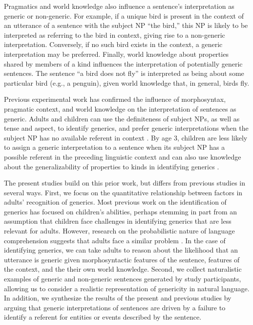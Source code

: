 \documentclass[10pt,letterpaper]{article}
\begin{document}
Pragmatics and world knowledge also influence a sentence's interpretation as generic or non-generic. For example, if a unique bird is present in the context of an utterance of a sentence with the subject NP ``the bird,'' this NP is likely to be interpreted as referring to the bird in context, giving rise to a non-generic interpretation. Conversely, if no such bird exists in the context, a generic interpretation may be preferred. Finally, world knowledge about properties shared by members of a kind influences the interpretation of potentially generic sentences. The sentence ``a bird does not fly'' is interpreted as being about some particular bird (e.g., a penguin), given world knowledge that, in general, birds fly. 

Previous experimental work has confirmed the influence of morphosyntax, pragmatic context, and world knowledge on the interpretation of sentences as generic. Adults and children can use the definiteness of subject NPs, as well as tense and aspect, to identify generics, and prefer generic interpretations when the subject NP has no available referent in context \cite{Gelman:2003,Cimpian:2011}. By age 3, children are less likely to assign a generic interpretation to a sentence when its subject NP has a possible referent in the preceding linguistic context and can also use knowledge about the generalizability of properties to kinds in identifying generics \cite{Cimpian:2008}.

The present studies build on this prior work, but differs from previous studies in several ways. First, we focus on the quantitative relationship between factors in adults' recognition of generics. Most previous work on the identification of generics has focused on children's abilities, perhaps stemming in part from an assumption that children face challenges in identifying generics that are less relevant for adults. However, research on the probabilistic nature of language comprehension suggests that adults face a similar problem \cite{Levy:2008,Frank:2012}. In the case of identifying generics, we can take adults to reason about the likelihood that an utterance is generic given morphosyntactic features of the sentence, features of the context, and the their own world knowledge. Second, we collect naturalistic examples of generic and non-generic sentences generated by study participants, allowing us to consider a realistic representation of genericity in natural language. In addition, we synthesize the results of the present and previous studies by arguing that generic interpretations of sentences are driven by a failure to identify a referent for entities or events described by the sentence. 
\end{document}
